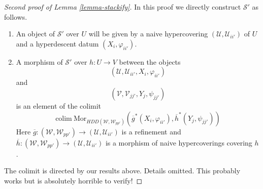 \begin{proof}[Second proof of Lemma \ref{lemma-stackify}]
In this proof we directly construct $\mathcal{S}'$ as follows.
\begin{enumerate}
\item An object of $\mathcal{S}'$ over $U$ will be given by a
naive hypercovering $(\mathcal{U}, \mathcal{U}_{ii'})$ of $U$
and a hyperdescent datum $(X_i, \varphi_{ii'})$.
\item A morphism of $\mathcal{S}'$ over $h : U \to V$
between the objects
$$
(\mathcal{U}, \mathcal{U}_{ii'}, X_i, \varphi_{ii'})
$$
and
$$
(\mathcal{V}, \mathcal{V}_{jj'}, Y_j, \psi_{jj'})
$$
is an element of the colimit
$$
\text{colim}\ \text{Mor}_{HDD(\mathcal{W}, \mathcal{W}_{pp'})}
(
\overline{g}^*(X_i, \varphi_{ii'}),
\overline{h}^*(Y_j, \psi_{jj'})
)
$$
Here
$\overline{g} : (\mathcal{W}, \mathcal{W}_{pp'}) \to
(\mathcal{U}, \mathcal{U}_{ii'})$ is a refinement and
$\overline{h} : (\mathcal{W}, \mathcal{W}_{pp'}) \to
(\mathcal{U}, \mathcal{U}_{ii'})$ is a morphism of naive hypercoverings
covering $h$.
\end{enumerate}
The colimit is directed by our results above.
Details omitted.
This probably works but is absolutely horrible to verify!
\end{proof}


























